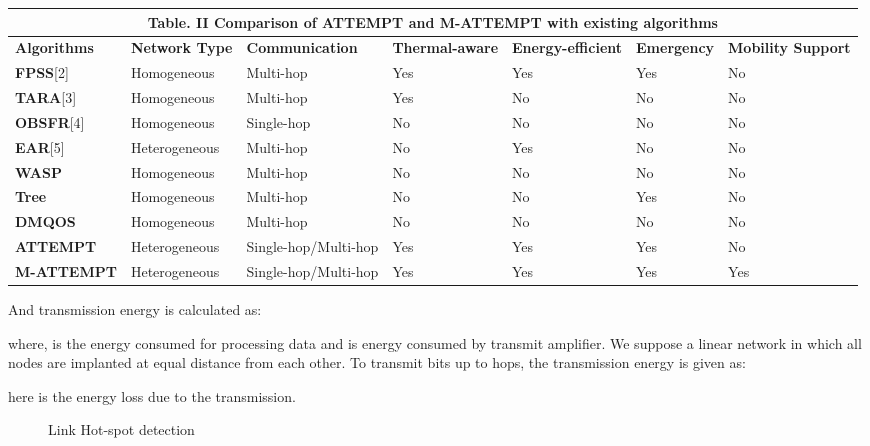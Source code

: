 \documentclass[journal]{IEEEtran}
\begin{document}
\begin{table*}[ht]
 \centering
\begin{tabular}{| p{1.8cm} || p{1.8cm} || p{2.5cm} || p{1.8cm} || p{2cm} || p{1.8cm}|| p{1.8cm}|}
  \multicolumn{7}{c}{Table. II Comparison of ATTEMPT and M-ATTEMPT with existing algorithms}\\
  \hline
  \textbf{Algorithms}&\textbf{Network Type }&\textbf{Communication}&\textbf{Thermal-aware}&\textbf{Energy-efficient}&\textbf{Emergency}&\textbf{Mobility Support}  \\ \hline \hline
   \textbf{FPSS}[2] 	& Homogeneous   &   Multi-hop    &  Yes     & Yes   & Yes  & No    \\ \hline
   \textbf{TARA}[3]	    & Homogeneous   &   Multi-hop	 &  Yes     & No    & No   & No   \\ \hline
   \textbf{OBSFR}[4] 	& Homogeneous   &   Single-hop   &  No      & No    & No   & No   \\ \hline
   \textbf{EAR}[5]      & Heterogeneous & Multi-hop      &  No      & Yes   & No   & No   \\ \hline
   \textbf{WASP}\cite{6}	& Homogeneous   &    Multi-hop	 &  No      & No    & No   & No    \\ \hline
   \textbf{Tree} \cite{7}	& Homogeneous   &   Multi-hop	 &  No      & No    & Yes  & No     \\ \hline
   \textbf{DMQOS}\cite{razzaque2011data} 	& Homogeneous   &    Multi-hop	 &  No        & No  & No   & No      \\ \hline
   \textbf{ATTEMPT}	    & Heterogeneous & Single-hop/Multi-hop & Yes  & Yes & Yes  & No     \\ \hline
   \textbf{M-ATTEMPT}	    & Heterogeneous & Single-hop/Multi-hop & Yes  & Yes & Yes  & Yes     \\ \hline
\end{tabular}
\end{table*}


And transmission energy  is calculated as:

where,  is the energy consumed for processing data and  is energy consumed by transmit amplifier. We suppose a linear network in which all nodes are implanted at equal distance from each other. To transmit  bits up to  hops, the transmission energy is given as:

here  is the energy loss due to the transmission.

\begin{figure*}[ht]
  \centering
  \caption{Link Hot-spot detection}\label{fig3}
\end{figure*}
\end{document}
